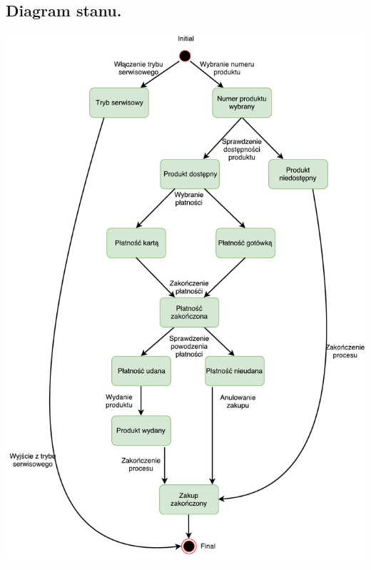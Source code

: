 \documentclass[11pt]{article}
\begin{document}
		\subsection{Diagram stanu.}
		\begin{center}
			\includegraphics[scale=0.7]{stanu1.pdf}
		\end{center}
\end{document}
